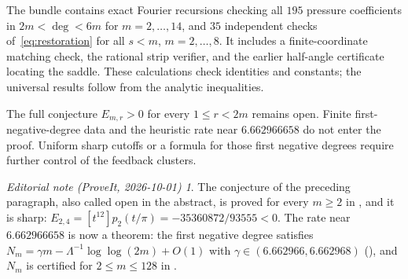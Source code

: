 \documentclass[11pt,a4paper]{article}
\theoremstyle{remark}\newtheorem*{ednote}{Editorial note (ProveIt, 2026-10-01)}
\begin{document}
The bundle contains exact Fourier recursions checking all $195$ pressure coefficients in $2m<\deg<6m$ for $m=2,\ldots,14$, and $35$ independent checks of~\eqref{eq:restoration} for all $s<m$, $m=2,\ldots,8$. It includes a finite-coordinate matching check, the rational strip verifier, and the earlier half-angle certificate locating the saddle. These calculations check identities and constants; the universal results follow from the analytic inequalities.

The full conjecture $E_{m,r}>0$ for every $1\le r<2m$ remains open. Finite first-negative-degree data and the heuristic rate near $6.662966658$ do not enter the proof. Uniform sharp cutoffs or a formula for those first negative degrees require further control of the feedback clusters.
\begin{ednote}
The conjecture of the preceding paragraph, also called open in the abstract, is proved for
every $m\ge2$ in , and it is sharp:
$E_{2,4}=[t^{12}]p_2(t/\pi)=-35360872/93555<0$. The rate near $6.662966658$ is now a theorem:
the first negative degree satisfies $N_m=\gamma m-\Lambda^{-1}\log\log(2m)+O(1)$ with $\gamma\in(6.662966,6.662968)$ (), and $N_m$
is certified for $2\le m\le128$ in .
\end{ednote}
\end{document}
